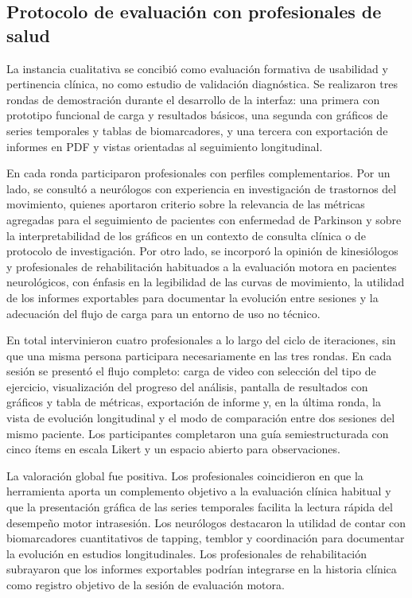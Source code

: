 \subsection{Protocolo de evaluación con profesionales de salud}

La instancia cualitativa se concibió como evaluación formativa de usabilidad y pertinencia clínica, no como estudio de validación diagnóstica. Se realizaron tres rondas de demostración durante el desarrollo de la interfaz: una primera con prototipo funcional de carga y resultados básicos, una segunda con gráficos de series temporales y tablas de biomarcadores, y una tercera con exportación de informes en PDF y vistas orientadas al seguimiento longitudinal.

En cada ronda participaron profesionales con perfiles complementarios. Por un lado, se consultó a neurólogos con experiencia en investigación de trastornos del movimiento, quienes aportaron criterio sobre la relevancia de las métricas agregadas para el seguimiento de pacientes con enfermedad de Parkinson y sobre la interpretabilidad de los gráficos en un contexto de consulta clínica o de protocolo de investigación. Por otro lado, se incorporó la opinión de kinesiólogos y profesionales de rehabilitación habituados a la evaluación motora en pacientes neurológicos, con énfasis en la legibilidad de las curvas de movimiento, la utilidad de los informes exportables para documentar la evolución entre sesiones y la adecuación del flujo de carga para un entorno de uso no técnico.

En total intervinieron cuatro profesionales a lo largo del ciclo de iteraciones, sin que una misma persona participara necesariamente en las tres rondas. En cada sesión se presentó el flujo completo: carga de video con selección del tipo de ejercicio, visualización del progreso del análisis, pantalla de resultados con gráficos y tabla de métricas, exportación de informe y, en la última ronda, la vista de evolución longitudinal y el modo de comparación entre dos sesiones del mismo paciente. Los participantes completaron una guía semiestructurada con cinco ítems en escala Likert y un espacio abierto para observaciones.

La valoración global fue positiva. Los profesionales coincidieron en que la herramienta aporta un complemento objetivo a la evaluación clínica habitual y que la presentación gráfica de las series temporales facilita la lectura rápida del desempeño motor intrasesión. Los neurólogos destacaron la utilidad de contar con biomarcadores cuantitativos de tapping, temblor y coordinación para documentar la evolución en estudios longitudinales. Los profesionales de rehabilitación subrayaron que los informes exportables podrían integrarse en la historia clínica como registro objetivo de la sesión de evaluación motora.

